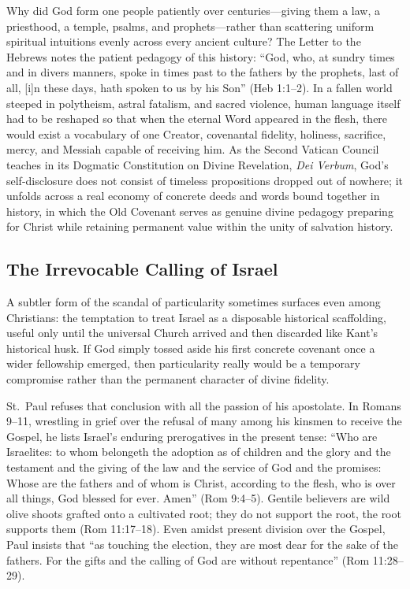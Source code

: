 Why did God form one people patiently over centuries---giving them a law, a priesthood, a temple, psalms, and prophets---rather than scattering uniform spiritual intuitions evenly across every ancient culture? The Letter to the Hebrews notes the patient pedagogy of this history: ``God, who, at sundry times and in divers manners, spoke in times past to the fathers by the prophets, last of all, [i]n these days, hath spoken to us by his Son'' (Heb 1:1--2). In a fallen world steeped in polytheism, astral fatalism, and sacred violence, human language itself had to be reshaped so that when the eternal Word appeared in the flesh, there would exist a vocabulary of one Creator, covenantal fidelity, holiness, sacrifice, mercy, and Messiah capable of receiving him. As the Second Vatican Council teaches in its Dogmatic Constitution on Divine Revelation, \textit{Dei Verbum}, God's self-disclosure does not consist of timeless propositions dropped out of nowhere; it unfolds across a real economy of concrete deeds and words bound together in history, in which the Old Covenant serves as genuine divine pedagogy preparing for Christ while retaining permanent value within the unity of salvation history.

\subsection{The Irrevocable Calling of Israel}

A subtler form of the scandal of particularity sometimes surfaces even among Christians: the temptation to treat Israel as a disposable historical scaffolding, useful only until the universal Church arrived and then discarded like Kant's historical husk. If God simply tossed aside his first concrete covenant once a wider fellowship emerged, then particularity really would be a temporary compromise rather than the permanent character of divine fidelity.

St.\ Paul refuses that conclusion with all the passion of his apostolate. In Romans 9--11, wrestling in grief over the refusal of many among his kinsmen to receive the Gospel, he lists Israel's enduring prerogatives in the present tense: ``Who are Israelites: to whom belongeth the adoption as of children and the glory and the testament and the giving of the law and the service of God and the promises: Whose are the fathers and of whom is Christ, according to the flesh, who is over all things, God blessed for ever. Amen'' (Rom 9:4--5). Gentile believers are wild olive shoots grafted onto a cultivated root; they do not support the root, the root supports them (Rom 11:17--18). Even amidst present division over the Gospel, Paul insists that ``as touching the election, they are most dear for the sake of the fathers. For the gifts and the calling of God are without repentance'' (Rom 11:28--29).

